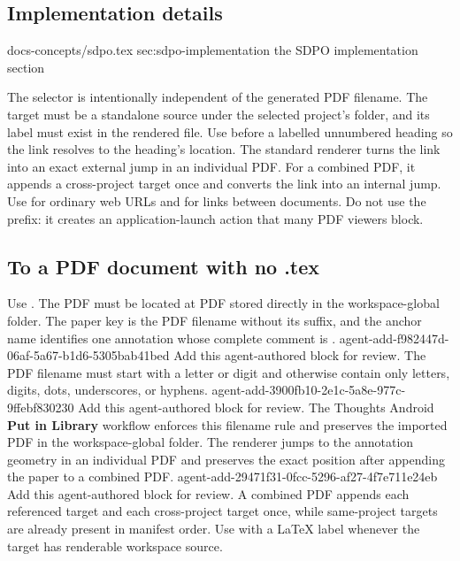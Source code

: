 \begin{DocCode}
\subsection*{Implementation details}
\label{sec:sdpo-implementation}

\TexLink
  {docs-concepts/sdpo.tex}
  {sec:sdpo-implementation}
  {the SDPO implementation section}
\end{DocCode}

The selector is intentionally independent of the generated PDF filename.
The target must be a standalone source under the selected project's  folder, and its label must exist in the rendered  file.
Use  before a labelled unnumbered heading so the link resolves to the heading's location.
The standard renderer turns the link into an exact external jump in an individual PDF.
For a combined PDF, it appends a cross-project target once and converts the link into an internal jump.
Use \code{\href} for ordinary web URLs and \code{\TexLink} for links between documents.
Do not use the  prefix: it creates an application-launch action that many PDF viewers block.

\subsection*{To a PDF document with no .tex}
Use \code{\PdfLink}.
The PDF must be located at PDF stored directly in the workspace-global  folder.
The paper key is the PDF filename without its  suffix, and the anchor name identifies one annotation whose complete comment is .
\agentProposedEdit
  {agent-add-f982447d-06af-5a67-b1d6-5305bab41bed}
  {Add this agent-authored block for review.}
  {}
  {The PDF filename must start with a letter or digit and otherwise contain only letters, digits, dots, underscores, or hyphens.}
\agentProposedEdit
  {agent-add-3900fb10-2e1c-5a8e-977c-9ffebf830230}
  {Add this agent-authored block for review.}
  {}
  {The Thoughts Android \textbf{Put in Library} workflow enforces this filename rule and preserves the imported PDF in the workspace-global  folder.}
The renderer jumps to the annotation geometry in an individual PDF and preserves the exact position after appending the paper to a combined PDF.
\agentProposedEdit
  {agent-add-29471f31-0fcc-5296-af27-4f7e711e24eb}
  {Add this agent-authored block for review.}
  {}
  {A combined PDF appends each referenced \code{\PdfLink} target and each cross-project \code{\TexLink} target once, while same-project \code{\TexLink} targets are already present in manifest order.}
Use \code{\TexLink} with a LaTeX label whenever the target has renderable workspace source.


